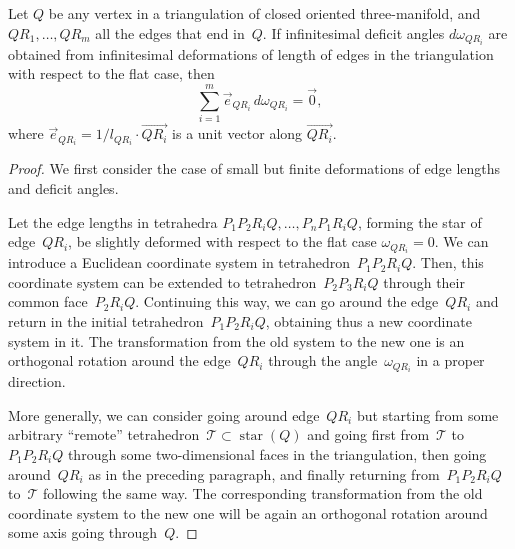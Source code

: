 \documentclass[pdftex]{sigma}
\DeclareMathOperator{\St}{star}
\begin{document}
\begin{lemma}
\label{lemma_infinitesimal}
Let $Q$ be any vertex in a triangulation of closed oriented three-manifold, and $QR_1,\ldots,\allowbreak QR_m$ all the edges that end in~$Q$. If infinitesimal deficit angles $d\omega_{QR_i}$ are obtained from infinitesimal deformations of length of edges in the triangulation with respect to the flat case, then{\samepage
\begin{equation}
\sum_{i=1}^m \vec e_{QR_i}\, d\omega_{QR_i} = \vec 0,
\label{eq_zero_for_dx*}
\end{equation}
where $\vec e_{QR_i}=1/l_{QR_i} \cdot \overrightarrow{QR_i}$ is a unit vector along $\overrightarrow{QR_i}$.}
\end{lemma}

\begin{proof}
We f\/irst consider the case of small but f\/inite deformations of edge lengths and def\/icit angles.

Let the edge lengths in tetrahedra $P_1P_2R_iQ, \ldots, P_nP_1R_iQ$, forming the star of edge~$QR_i$, be slightly deformed with respect to the f\/lat case $\omega_{QR_i}=0$. We can introduce a Euclidean coordinate system in tetrahedron~$P_1P_2R_iQ$. Then, this coordinate system can be extended to tetrahedron~$P_2P_3R_iQ$ through their common face~$P_2R_iQ$. Continuing this way, we can go around the edge~$QR_i$ and return in the initial tetrahedron~$P_1P_2R_iQ$, obtaining thus a new coordinate system in it. The transformation from the old system to the new one is an orthogonal rotation around the edge~$QR_i$ through the angle~$\omega_{QR_i}$ in a proper direction.

More generally, we can consider going around edge~$QR_i$ but starting from some arbitrary ``remote'' tetrahedron~$\mathcal T \subset \St(Q)$ and going f\/irst from~$\mathcal T$ to~$P_1P_2R_iQ$ through some two-dimen\-sion\-al faces in the triangulation, then going around~$QR_i$ as in the preceding paragraph, and f\/inally returning from~$P_1P_2R_iQ$ to~$\mathcal T$ following the same way. The corresponding transformation from the old coordinate system to the new one will be again an orthogonal rotation around some axis going through~$Q$.


\end{proof}
\end{document}
